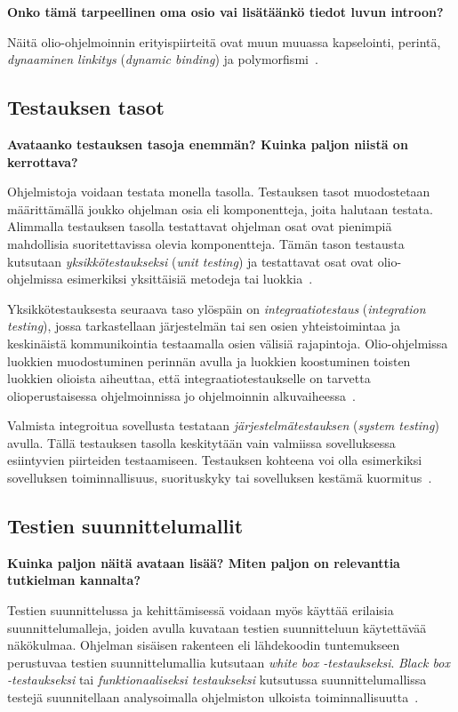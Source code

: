 \documentclass[finnish, grading]{tktltiki2}
\theoremstyle{definition}
\theoremstyle{remark}
\begin{document}
\textbf{Onko tämä tarpeellinen oma osio vai lisätäänkö tiedot luvun introon?} 

 Näitä olio-ohjelmoinnin erityispiirteitä ovat muun muuassa kapselointi, perintä, \textit{dynaaminen linkitys} (\textit{dynamic binding}) ja polymorfismi~\cite[s. 86]{Mariani:Pezze:2008}.


\subsection{Testauksen tasot}

\textbf{Avataanko testauksen tasoja enemmän? Kuinka paljon niistä on kerrottava?}

Ohjelmistoja voidaan testata monella tasolla. Testauksen tasot muodostetaan määrittämällä joukko ohjelman osia eli komponentteja, joita halutaan testata. Alimmalla testauksen tasolla testattavat ohjelman osat ovat pienimpiä mahdollisia suoritettavissa olevia komponentteja. Tämän tason testausta kutsutaan \textit{yksikkötestaukseksi} (\textit{unit testing}) ja testattavat osat ovat olio-ohjelmissa esimerkiksi yksittäisiä metodeja tai luokkia~\cite[s. 45]{Binder:1999}.

Yksikkötestauksesta seuraava taso ylöspäin on \textit{integraatiotestaus} (\textit{integration testing}), jossa tarkastellaan järjestelmän tai sen osien yhteistoimintaa ja keskinäistä kommunikointia testaamalla osien välisiä rajapintoja. Olio-ohjelmissa luokkien muodostuminen perinnän avulla ja luokkien koostuminen toisten luokkien olioista aiheuttaa, että integraatiotestaukselle on tarvetta olioperustaisessa ohjelmoinnissa jo ohjelmoinnin alkuvaiheessa~\cite[s. 45]{Binder:1999}.

Valmista integroitua sovellusta testataan \textit{järjestelmätestauksen} (\textit{system testing}) avulla. Tällä testauksen tasolla keskitytään vain valmiissa sovelluksessa esiintyvien piirteiden testaamiseen. Testauksen kohteena voi olla esimerkiksi sovelluksen toiminnallisuus, suorituskyky tai sovelluksen kestämä kuormitus~\cite[s. 45]{Binder:1999}.


\subsection{Testien suunnittelumallit}

\textbf{Kuinka paljon näitä avataan lisää? Miten paljon on relevanttia tutkielman kannalta?}

Testien suunnittelussa ja kehittämisessä voidaan myös käyttää erilaisia suunnittelumalleja, joiden avulla kuvataan testien suunnitteluun käytettävää näkökulmaa. Ohjelman sisäisen rakenteen eli lähdekoodin tuntemukseen perustuvaa testien suunnittelumallia kutsutaan \textit{white box -testaukseksi}. \textit{Black box -testaukseksi} tai \textit{funktionaaliseksi testaukseksi} kutsutussa suunnittelumallissa testejä suunnitellaan analysoimalla ohjelmiston ulkoista toiminnallisuutta~\cite[s. 52]{Binder:1999}.
\end{document}

